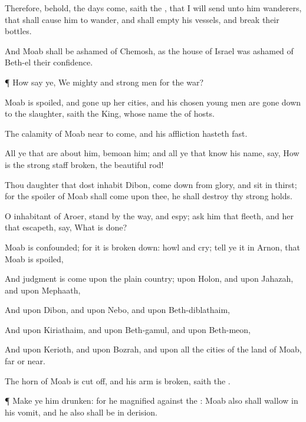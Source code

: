 {Therefore, behold, the
days
come,
saith the
{}, that I will
send unto him
wanderers, that shall cause him to
wander, and shall
empty his
vessels, and
break their
bottles.

And
Moab shall be
ashamed of
Chemosh, as the
house of
Israel was
ashamed of
Beth-el their
confidence.


\par }{\PP {}¶ How
say ye, We
{}
mighty and
strong
men for the
war?

Moab is
spoiled, and gone
up
{} her
cities, and his
chosen young
men are gone
down to the
slaughter,
saith the
King, whose
name
{} the
{} of
hosts.

The
calamity of
Moab
{}
near to
come, and his
affliction
hasteth
fast.

All ye that are
about him,
bemoan him; and all ye that
know his
name,
say, How is the
strong
staff
broken,
{} the
beautiful
rod!

Thou
daughter that dost
inhabit
Dibon, come
down from
{}
glory, and
sit in
thirst; for the
spoiler of
Moab shall
come upon thee,
{} he shall
destroy thy strong
holds.

O
inhabitant of
Aroer,
stand by the
way, and
espy;
ask him that
fleeth, and her that
escapeth,
{}
say, What is
done?

Moab is
confounded; for it is broken
down:
howl and
cry;
tell ye it in
Arnon, that
Moab is
spoiled,

And
judgment is
come upon the
plain
country; upon
Holon, and upon
Jahazah, and upon
Mephaath,

And upon
Dibon, and upon
Nebo, and upon
Beth-diblathaim,

And upon
Kiriathaim, and upon
Beth-gamul, and upon
Beth-meon,

And upon
Kerioth, and upon
Bozrah, and upon all the
cities of the
land of
Moab,
far or
near.

The
horn of
Moab is cut
off, and his
arm is
broken,
saith the
{}.


\par }{\PP {}¶ Make ye him
drunken: for he
magnified
{} against the
{}:
Moab also shall
wallow in his
vomit, and he also shall be in
derision.

}
